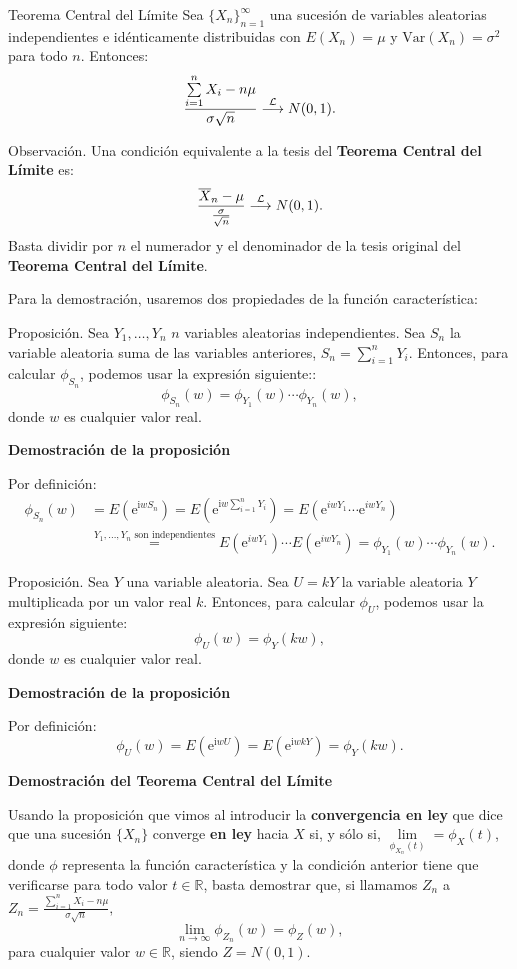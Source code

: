 \documentclass[]{book}
\begin{document}
 Teorema Central del Límite
Sea \(\{X_n\}_{n=1}^\infty\) una sucesión de variables aleatorias independientes e idénticamente distribuidas con \(E(X_n)=\mu\) y \(\mathrm{Var}(X_n)=\sigma^2\) para todo \(n\). Entonces:
\[
\frac{\sum\limits_{i=1}^n X_i-n\mu}{\sigma\sqrt{n}}\stackrel{{\cal L}}{\longrightarrow} N(0,1).
\]

 Observación.
Una condición equivalente a la tesis del \textbf{Teorema Central del Límite} es:
\[
\frac{\overline{X}_n-\mu}{\frac{\sigma}{\sqrt{n}}}\stackrel{{\cal L}}{\longrightarrow} N(0,1).
\]
Basta dividir por \(n\) el numerador y el denominador de la tesis original del \textbf{Teorema Central del Límite}.

Para la demostración, usaremos dos propiedades de la función característica:

 Proposición.
Sea \(Y_1,\ldots, Y_n\) \(n\) variables aleatorias independientes. Sea \(S_n\) la variable aleatoria suma de las variables anteriores, \(S_n=\sum\limits_{i=1}^n Y_i\). Entonces, para calcular \(\phi_{S_n}\), podemos usar la expresión siguiente::
\[
\phi_{S_n}(w)=\phi_{Y_1}(w)\cdots \phi_{Y_n}(w),
\]
donde \(w\) es cualquier valor real.

\textbf{Demostración de la proposición}

Por definición:
\[
\begin{array}{rl}
\phi_{S_n}(w) & =E\left(\mathrm{e}^{\mathrm{i} w S_n}\right)=E\left(\mathrm{e}^{\mathrm{i} w \sum\limits_{i=1}^n Y_i}\right) = E\left(\mathrm{e}^{i w Y_1}\cdots \mathrm{e}^{i w Y_n}\right)\\ & \stackrel{\mbox{$Y_1,\ldots,Y_n$ son independientes}}{=} E\left(\mathrm{e}^{i w Y_1}\right)\cdots E\left(\mathrm{e}^{i w Y_n}\right) =\phi_{Y_1}(w)\cdots \phi_{Y_n}(w).
\end{array}
\]

 Proposición.
Sea \(Y\) una variable aleatoria. Sea \(U=kY\) la variable aleatoria \(Y\) multiplicada por un valor real \(k\). Entonces, para calcular \(\phi_{U}\), podemos usar la expresión siguiente:
\[
\phi_{U}(w)=\phi_Y(kw),
\]
donde \(w\) es cualquier valor real.

\textbf{Demostración de la proposición}

Por definición:
\[
\phi_{U}(w)=E\left(\mathrm{e}^{\mathrm{i} w U}\right) = E\left(\mathrm{e}^{\mathrm{i} w k Y}\right)=\phi_Y(kw).
\]

\textbf{Demostración del Teorema Central del Límite}

Usando la proposición que vimos al introducir la \textbf{convergencia en ley} que dice que una sucesión \(\{X_n\}\) converge \textbf{en ley} hacia \(X\) si, y sólo si, \(\lim\limits_{\phi_{X_n}(t)}=\phi_{X}(t)\), donde \(\phi\) representa la función característica y la condición anterior tiene que verificarse para todo valor \(t\in\mathbb{R}\), basta demostrar que, si llamamos \(Z_n\) a
\(Z_n = \frac{\sum\limits_{i=1}^n X_i-n\mu}{\sigma\sqrt{n}},\)
\[
\lim_{n\to \infty}\phi_{Z_n}(w)=\phi_Z(w),
\]
para cualquier valor \(w\in\mathbb{R}\), siendo \(Z=N(0,1)\).
\end{document}
